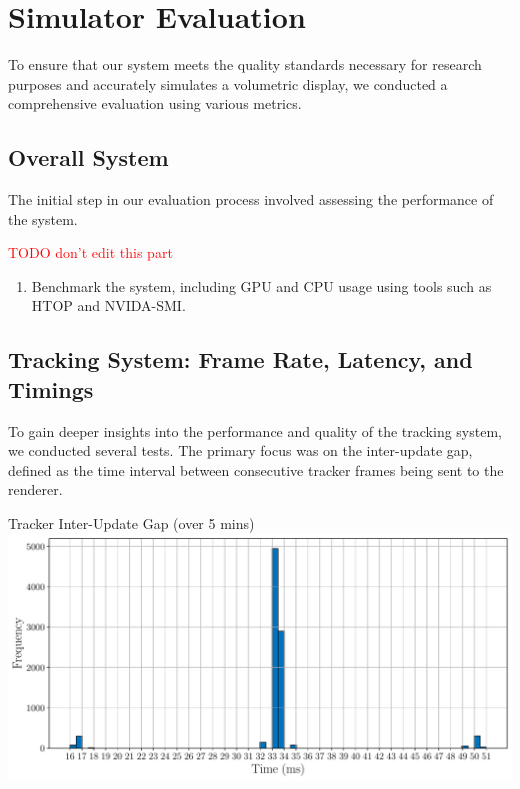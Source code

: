 \section{Simulator Evaluation}

To ensure that our system meets the quality standards necessary for research purposes and accurately simulates a volumetric display, we conducted a comprehensive evaluation using various metrics.

\subsection{Overall System}

The initial step in our evaluation process involved assessing the performance of the system.

\textcolor{red}{TODO don't edit this part}
\begin{enumerate}
    \item Benchmark the system, including GPU and CPU usage using tools such as HTOP and NVIDA-SMI.
\end{enumerate}

\subsection{Tracking System: Frame Rate, Latency, and Timings}

To gain deeper insights into the performance and quality of the tracking system, we conducted several tests. The primary focus was on the inter-update gap, defined as the time interval between consecutive tracker frames being sent to the renderer.

\begin{figureBox}[label={fig:framerate-overall}, width=1.0\linewidth]{Tracker Inter-Update Gap (over 5 mins)}
    \includegraphics[width = 1.0\linewidth]{./evaluation/figures/framerate-overall.pdf}
\end{figureBox}

